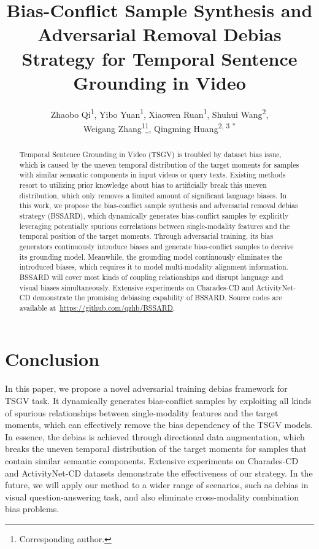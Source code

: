 \documentclass[letterpaper]{article} %
\title{Bias-Conflict Sample Synthesis and Adversarial Removal Debias Strategy for Temporal Sentence Grounding in Video}
\author{
	Zhaobo Qi\textsuperscript{\rm 1},
	Yibo Yuan\textsuperscript{\rm 1},
	Xiaowen Ruan\textsuperscript{\rm 1},
	Shuhui Wang\textsuperscript{\rm 2}, \\
	Weigang Zhang\textsuperscript{\rm 1}\thanks{Corresponding author.},
	Qingming Huang\textsuperscript{\rm 2, \rm 3 *}
}
\begin{document}
\maketitle

\begin{abstract}
	Temporal Sentence Grounding in Video (TSGV) is troubled by dataset bias issue, which is caused by the uneven temporal distribution of the target moments for samples with similar semantic components in input videos or query texts. Existing methods resort to utilizing prior knowledge about bias to artificially break this uneven distribution, which only removes a limited amount of significant language biases. In this work, we propose the bias-conflict sample synthesis and adversarial removal debias strategy (BSSARD), which dynamically generates bias-conflict samples by explicitly leveraging potentially spurious correlations between single-modality features and the temporal position of the target moments. Through adversarial training, its bias generators continuously introduce biases and generate bias-conflict samples to deceive its grounding model. Meanwhile, the grounding model continuously eliminates the introduced biases, which requires it to model multi-modality alignment information. BSSARD will cover most kinds of coupling relationships and disrupt language and visual biases simultaneously. Extensive experiments on Charades-CD and ActivityNet-CD demonstrate the promising debiasing capability of BSSARD. Source codes are available at~\url{https://github.com/qzhb/BSSARD}.
\end{abstract}













\section{Conclusion}
In this paper, we propose a novel adversarial training debias framework for TSGV task.
It dynamically generates bias-conflict samples by exploiting all kinds of spurious relationships between single-modality features and the target moments, which can effectively remove the bias dependency of the TSGV models.
In essence, the debias is achieved through directional data augmentation, which breaks the uneven temporal distribution of the target moments for samples that contain similar semantic components.
Extensive experiments on Charades-CD and ActivityNet-CD datasets demonstrate the effectiveness of our strategy.
In the future, we will apply our method to a wider range of scenarios, such as debias in visual question-answering task, and also eliminate cross-modality combination bias problems.
\end{document}
